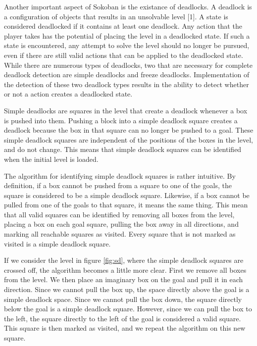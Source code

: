 \documentclass[times, 10pt,twocolumn]{article}
\begin{document}

Another important aspect of Sokoban is the existance of deadlocks. A deadlock is a configuration of objects that results in an unsolvable level [1]. A state is considered deadlocked if it contains at least one deadlock. Any action that the player takes has the potential of placing the level in a deadlocked state. If such a state is encountered, any attempt to solve the level should no longer be pursued, even if there are still valid actions that can be applied to the deadlocked state. While there are numerous types of deadlocks, two that are necessary for complete deadlock detection are simple deadlocks and freeze deadlocks. Implementation of the detection of these two deadlock types results in the ability to detect whether or not a action creates a deadlocked state. 


Simple deadlocks are squares in the level that create a deadlock whenever a box is pushed into them. Pushing a block into a simple deadlock square creates a deadlock because the box in that square can no longer be pushed to a goal. These simple deadlock squares are independent of the positions of the boxes in the level, and do not change. This means that simple deadlock squares can be identified when the initial level is loaded. 

The algorithm for identifying simple deadlock squares is rather intuitive. By definition, if a box cannot be pushed from a square to one of the goals, the square is considered to be a simple deadlock square. Likewise, if a box cannot be pulled from one of the goals to that square, it means the same thing. This mean that all valid squares can be identified by removing all boxes from the level, placing a box on each goal square, pulling the box away in all directions, and marking all reachable squares as visited. Every square that is not marked as visited is a simple deadlock square. \cite{Wiki}

If we consider the level in figure \ref{fig:sd}, where the simple deadlock squares are crossed off, the algorithm becomes a little more clear. First we remove all boxes from the level. We then place an imaginary box on the goal and pull it in each direction. Since we cannot pull the box up, the space directly above the goal is a simple deadlock space. Since we cannot pull the box down, the square directly below the goal is a simple deadlock square. However, since we can pull the box to the left, the square directly to the left of the goal is considered a valid square. This square is then marked as visited, and we repeat the algorithm on this new square. 
\end{document}
